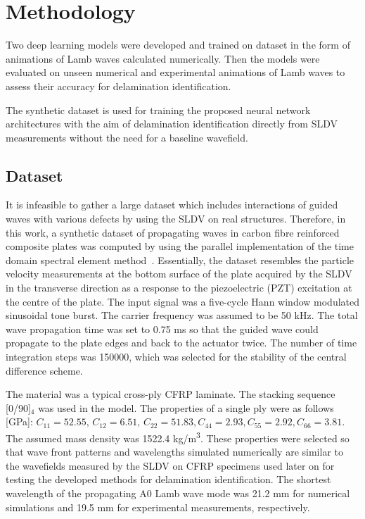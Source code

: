 \section{Methodology}
\begin{sloppypar}
	Two deep learning models were developed and trained on dataset in the form 
	of animations of Lamb waves calculated numerically. Then the models were 
	evaluated on unseen numerical and experimental animations of Lamb waves to 
	assess their accuracy for delamination identification.
	
	The synthetic dataset is used for training the proposed neural network architectures with the aim of delamination identification directly from SLDV measurements without the need for a baseline wavefield.
	\subsection{Dataset}
	It is infeasible to gather a large dataset which includes interactions of guided waves with various defects by using the SLDV on real structures. 
	Therefore, in this work, a synthetic dataset of propagating waves in carbon fibre reinforced composite plates was computed by using the parallel implementation of the time domain spectral element method~\cite{Kudela2020}. 
	Essentially, the dataset resembles the particle velocity measurements at the bottom surface of the plate acquired by the SLDV in the transverse direction as a response to the piezoelectric (PZT) excitation at the centre of the plate. 
	The input signal was a five-cycle Hann window modulated sinusoidal tone burst. The carrier frequency was assumed to be 50 kHz. 
	The total wave propagation time was set to 0.75 ms so that the guided wave could propagate to the plate edges and back to the actuator twice.
	The number of time integration steps was 150000, which was selected for the stability of the central difference scheme.
	
	The material was a typical cross-ply CFRP laminate. 
	The stacking sequence [0/90]\(_4\) was used in the model. 
	The properties of a single ply were as follows [GPa]:
	\(C_{11} = 52.55, \, C_{12} = 6.51, \, C_{22} = 51.83, C_{44} = 2.93, C_{55} = 2.92, C_{66} = 3.81\). 
	The assumed mass density was 1522.4 kg/m\textsuperscript{3}.
	These properties were selected so that wave front patterns and wavelengths simulated numerically are similar to the wavefields measured by the SLDV on CFRP specimens used later on for testing the developed methods for delamination identification.
	The shortest wavelength of the propagating A0 Lamb wave mode was 21.2 mm for numerical simulations and 19.5 mm for experimental measurements, respectively.
	

\end{sloppypar}
